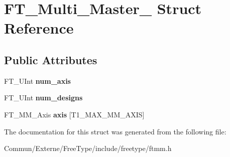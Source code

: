 \hypertarget{struct_f_t___multi___master__}{}\section{F\+T\+\_\+\+Multi\+\_\+\+Master\+\_\+ Struct Reference}
\label{struct_f_t___multi___master__}
\subsection*{Public Attributes}
\begin{DoxyCompactItemize}
\item 
F\+T\+\_\+\+U\+Int {\bfseries num\+\_\+axis}\hypertarget{struct_f_t___multi___master___a90a0ace4e40b91912259ad52fc86fb6f}{}\label{struct_f_t___multi___master___a90a0ace4e40b91912259ad52fc86fb6f}

\item 
F\+T\+\_\+\+U\+Int {\bfseries num\+\_\+designs}\hypertarget{struct_f_t___multi___master___a78b797ee560f4b00795a7dce9656178d}{}\label{struct_f_t___multi___master___a78b797ee560f4b00795a7dce9656178d}

\item 
F\+T\+\_\+\+M\+M\+\_\+\+Axis {\bfseries axis} \mbox{[}T1\+\_\+\+M\+A\+X\+\_\+\+M\+M\+\_\+\+A\+X\+IS\mbox{]}\hypertarget{struct_f_t___multi___master___a1eb062ff3b5ac245ab9421a46b349818}{}\label{struct_f_t___multi___master___a1eb062ff3b5ac245ab9421a46b349818}

\end{DoxyCompactItemize}


The documentation for this struct was generated from the following file\+:\begin{DoxyCompactItemize}
\item 
Commun/\+Externe/\+Free\+Type/include/freetype/ftmm.\+h\end{DoxyCompactItemize}
